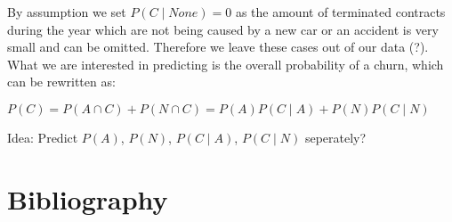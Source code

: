 \documentclass[12pt,titlepage]{article}
\begin{document}
By assumption we set $P(C\mid None) = 0$ as the amount of terminated contracts during the year which are not being
caused by a new car or an accident is very small and can be omitted. Therefore we leave these cases out of our data
(?). What we are interested in predicting is the overall probability of a churn, which can be rewritten as:

\begin{center}
    $P(C) = P(A\cap C) + P(N\cap C) = P(A)P(C\mid A) + P(N)P(C\mid N)$
\end{center}

Idea: Predict $P(A)$, $P(N)$, $P(C\mid A)$, $P(C\mid N)$ seperately?

\newpage

\thispagestyle{empty}

\section*{Bibliography}
\vspace*{6mm}
\end{document}
